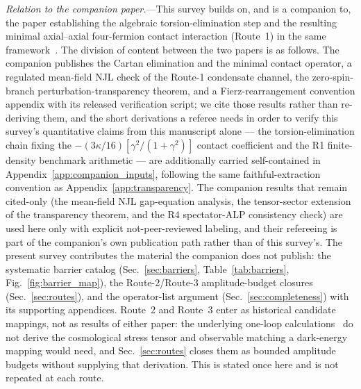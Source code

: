 \documentclass[aps,prd,twocolumn,superscriptaddress,showpacs,preprintnumbers,nofootinbib,longbibliography,floatfix]{revtex4-2}
\begin{document}
\emph{Relation to the companion paper.}---This survey builds on, and is a
companion to, the paper establishing the algebraic torsion-elimination step
and the resulting minimal axial--axial four-fermion contact interaction
(Route~1) in the same framework~\cite{Golden2026P1a}. The division of
content between the two papers is as follows. The companion publishes the
Cartan elimination and the minimal contact operator, a regulated mean-field
NJL check of the Route-1 condensate channel, the zero-spin-branch
perturbation-transparency theorem, and a Fierz-rearrangement convention
appendix with its released verification script; we cite those results
rather than re-deriving them, and the short derivations a referee needs
in order to verify this survey's quantitative claims from this manuscript
alone --- the torsion-elimination chain fixing the
$-(3\kappa/16)[\gamma^2/(1+\gamma^2)]$ contact coefficient and the R1
finite-density benchmark arithmetic --- are additionally carried
self-contained in Appendix~\ref{app:companion_inputs}, following the same
faithful-extraction convention as Appendix~\ref{app:transparency}. The
companion results that remain cited-only (the mean-field NJL gap-equation
analysis, the tensor-sector extension of the transparency theorem, and
the R4 spectator-ALP consistency check) are used here only with explicit
not-peer-reviewed labeling, and their refereeing is part of the
companion's own publication path rather than of this survey's. The present survey contributes the material
the companion does not publish: the systematic barrier catalog
(Sec.~\ref{sec:barriers}, Table~\ref{tab:barriers},
Fig.~\ref{fig:barrier_map}), the Route-2/Route-3 amplitude-budget closures
(Sec.~\ref{sec:routes}), and the operator-list argument
(Sec.~\ref{sec:completeness}) with its supporting appendices. Route~2 and
Route~3 enter as historical candidate mappings, not as results of either
paper: the underlying one-loop
calculations~\cite{ShapiroTeixeira2014,BenedettiSpeziale2011run} do not
derive the cosmological stress tensor and observable matching a
dark-energy mapping would need, and Sec.~\ref{sec:routes} closes them as
bounded amplitude budgets without supplying that derivation. This is
stated once here and is not repeated at each route.
\end{document}
